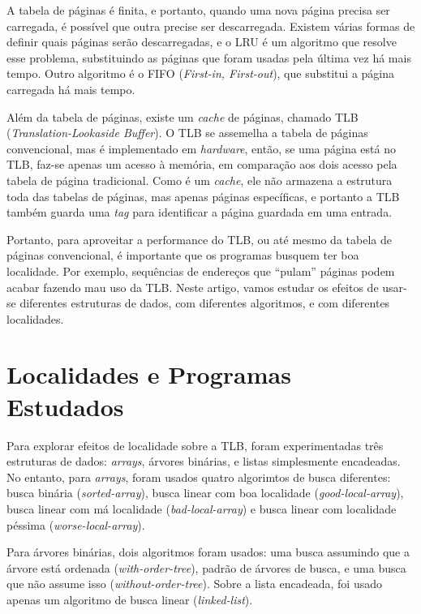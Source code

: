 \documentclass[a4paper]{article}
\begin{document}
A tabela de páginas é finita, e portanto, quando uma nova página precisa ser
carregada, é possível que outra precise ser descarregada. Existem várias formas
de definir quais páginas serão descarregadas, e o LRU é um algoritmo que resolve
esse problema, substituindo as páginas que foram usadas pela última vez há mais
tempo. Outro algoritmo é o FIFO (\textit{First-in, First-out}), que substitui a
página carregada há mais tempo.

Além da tabela de páginas, existe um \textit{cache} de páginas, chamado TLB
(\textit{Translation-Lookaside Buffer}). O TLB se assemelha a tabela de
páginas convencional, mas é implementado em \textit{hardware}, então, se uma
página está no TLB, faz-se apenas um acesso à memória, em comparação aos
dois acesso pela tabela de página tradicional. Como é um \textit{cache}, ele não
armazena a estrutura toda das tabelas de páginas, mas apenas páginas
específicas, e portanto a TLB também guarda uma \textit{tag} para identificar a
página guardada em uma entrada.

Portanto, para aproveitar a performance do TLB, ou até mesmo da tabela de
páginas convencional, é importante que os programas busquem ter boa localidade.
Por exemplo, sequências de endereços que ``pulam'' páginas podem acabar fazendo
mau uso da TLB. Neste artigo, vamos estudar os efeitos de usar-se diferentes
estruturas de dados, com diferentes algoritmos, e com diferentes localidades.

\section{Localidades e Programas Estudados}

Para explorar efeitos de localidade sobre a TLB, foram experimentadas três
estruturas de dados: \textit{arrays}, árvores binárias, e listas simplesmente
encadeadas. No entanto, para \textit{arrays}, foram usados quatro algorimtos de
busca diferentes: busca binária (\textit{sorted-array}), busca linear com boa
localidade (\textit{good-local-array}), busca linear com má localidade
(\textit{bad-local-array}) e busca linear com localidade péssima
(\textit{worse-local-array}).

Para árvores binárias, dois algoritmos foram usados: uma busca assumindo que a
árvore está ordenada (\textit{with-order-tree}), padrão de árvores de busca, e
uma busca que não assume isso (\textit{without-order-tree}). Sobre a lista
encadeada, foi usado apenas um algoritmo de busca linear (\textit{linked-list}).
\end{document}
